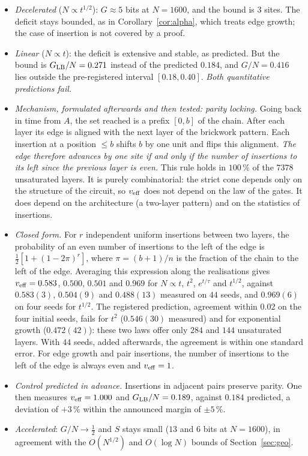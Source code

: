 \begin{itemize}[leftmargin=*,itemsep=1pt]
\item \emph{Decelerated} ($N\propto t^{1/2}$): $G\approx5$ bits at $N=1600$, and the bound is $3$ sites. The deficit stays bounded, as in Corollary~\ref{cor:alpha}, which treats edge growth; the case of insertion is not covered by a proof.
\item \emph{Linear} ($N\propto t$): the deficit is extensive and stable, as predicted. But the bound is $G_{\rm LB}/N=0.271$ instead of the predicted $0.184$, and $G/N=0.416$ lies outside the pre-registered interval $[0.18,0.40]$. \emph{Both quantitative predictions fail.}
\item \emph{Mechanism, formulated afterwards and then tested: parity locking.} Going back in time from $A$, the set reached is a prefix $[0,b]$ of the chain. After each layer its edge is aligned with the next layer of the brickwork pattern. Each insertion at a position $\le b$ shifts $b$ by one unit and flips this alignment. \emph{The edge therefore advances by one site if and only if the number of insertions to its left since the previous layer is even.} This rule holds in $100\,\%$ of the $7378$ unsaturated layers. It is purely combinatorial: the strict cone depends only on the structure of the circuit, so $v_{\rm eff}$ does not depend on the law of the gates. It does depend on the architecture (a two-layer pattern) and on the statistics of insertions.
\item \emph{Closed form.} For $r$ independent uniform insertions between two layers, the probability of an even number of insertions to the left of the edge is $\frac12[1+(1-2\pi)^r]$, where $\pi=(b+1)/n$ is the fraction of the chain to the left of the edge. Averaging this expression along the realisations gives $v_{\rm eff}=0.583$, $0.500$, $0.501$ and $0.969$ for $N\propto t$, $t^2$, $e^{t/\tau}$ and $t^{1/2}$, against $0.583(3)$, $0.504(9)$ and $0.488(13)$ measured on $44$ seeds, and $0.969(6)$ on four seeds for $t^{1/2}$. The registered prediction, agreement within $0.02$ on the four initial seeds, fails for $t^2$ ($0.546(30)$ measured) and for exponential growth ($0.472(42)$): these two laws offer only $284$ and $144$ unsaturated layers. With $44$ seeds, added afterwards, the agreement is within one standard error. For edge growth and pair insertions, the number of insertions to the left of the edge is always even and $v_{\rm eff}=1$.
\item \emph{Control predicted in advance.} Insertions in adjacent pairs preserve parity. One then measures $v_{\rm eff}=1.000$ and $G_{\rm LB}/N=0.189$, against $0.184$ predicted, a deviation of $+3\,\%$ within the announced margin of $\pm5\,\%$.
\item \emph{Accelerated}: $G/N\to\frac12$ and $S$ stays small ($13$ and $6$ bits at $N=1600$), in agreement with the $O(N^{1/2})$ and $O(\log N)$ bounds of Section~\ref{sec:geo}.
\end{itemize}

